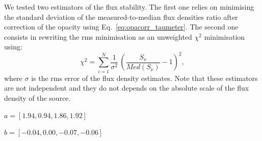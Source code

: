 We tested two estimators of the flux stability. The first one relies
on minimising the
standard deviation of the measured-to-median flux densities ratio
after correction of the opacity using Eq.~\ref{eq:opacorr_taumeter}. The second
one consists in rewriting the rms minimisation as an unweighted
$\chi^2$ minimisation using:
\begin{equation}
\chi^2 = \sum_{i=1}^{N} \frac{1}{\sigma^2} \, \left( \frac{S_\nu}{Med(S_\nu)} -1 \right)^2,  
\end{equation}
where $\sigma$ is the rms error of the flux density estimates. Note
that these estimators are not independent and they do not depends on
the absolute scale of the flux density of the source.  




$a = [1.94,  0.94,  1.86,  1.92]$

$b = [-0.04, 0.00, -0.07, -0.06]$


